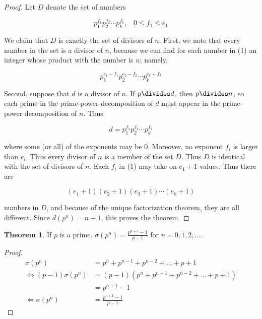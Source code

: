 \documentclass{article}
\theoremstyle{definition} %
\newtheorem{theorem}{Theorem}[section] %
\theoremstyle{definition}
\theoremstyle{definition}
\theoremstyle{definition}
\begin{document}
  \begin{proof}
    Let $D$ denote the set of numbers
    
    \begin{equation}
      p_1^{f_1}p_2^{f_2}\cdots p_k^{f_k}, \;\;\; 0 \leq f_1 \leq e_1
    \end{equation}
    
    We claim that $D$ is exactly the set of divisors of $n$. First, we note that every number
    in the set is a divisor of $n$, because we can find for each number in (1) an integer
    whose product with the number is $n$; namely,
    
    \[ p_1^{e_1-f_1}p_2^{e_2-f_2}\cdots p_k^{e_k-f_k} \]
    
    Second, suppose that $d$ is a divisor of $n$. If $p \divides d$, then $p \divides n$, so
    each prime in the prime-power decomposition of $d$ must appear in the prime-power
    decomposition of $n$. Thus
    
    \[ d = p_1^{f_1}p_2^{f_2}\cdots p_k^{f_k} \]
    
    where some (or all) of the exponents may be 0. Moreover, no exponent $f_i$ is larger
    than $e_i$. Thus every divisor of $n$ is a member of the set $D$. Thus $D$ is
    identical with the set of divisors of $n$. Each $f_i$ in (1) may take on $e_1 + 1$ values.
    Thus there are
    
    \[ (e_1 + 1)(e_2 + 1)(e_3 + 1) \cdots (e_k + 1) \]
    
    numbers in $D$, and because of the unique factorization theorem, they are all different.
    Since $d(p^n) = n + 1$, this proves the theorem.
  \end{proof}
  
  \begin{theorem}
    If $p$ is a prime, $\sigma(p^n) = \frac{p^{n+1} - 1}{p - 1}$ for $n = 0, 1, 2, \dots$.
  \end{theorem}
  
  \begin{proof}
    \begin{align*}
      \sigma(p^n) &= p^n + p^{n-1} + p^{n-2} + \dots + p + 1 \\
      \Leftrightarrow (p - 1)\sigma(p^n) &= (p - 1)(p^n + p^{n-1} + p^{n-2} + \dots + p + 1) \\
      &= p^{n+1} - 1 \\
      \Leftrightarrow  \sigma(p^n) &= \frac{p^{n+1} - 1}{p - 1}
    \end{align*}
  \end{proof}
  
\end{document}

